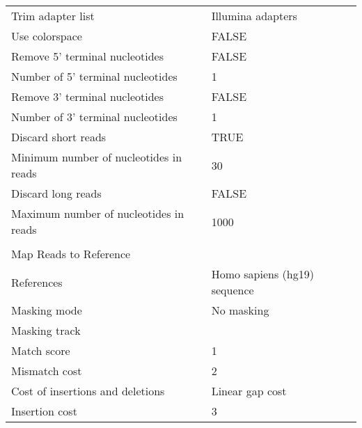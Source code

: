 \begin{longtable}{ll}
Trim adapter list                            & Illumina adapters                              \\
Use colorspace                               & FALSE                                          \\
Remove 5' terminal nucleotides               & FALSE                                          \\
Number of 5' terminal nucleotides            & 1                                              \\
Remove 3' terminal nucleotides               & FALSE                                          \\
Number of 3' terminal nucleotides            & 1                                              \\
Discard short reads                          & TRUE                                           \\
Minimum number of nucleotides in reads       & 30                                             \\
Discard long reads                           & FALSE                                          \\
Maximum number of nucleotides in reads       & 1000                                           \\
                                             &                                                \\
Map Reads to Reference                       &                                                \\
References                                   & Homo sapiens (hg19) sequence                   \\
Masking mode                                 & No masking                                     \\
Masking track                                &                                                \\
Match score                                  & 1                                              \\
Mismatch cost                                & 2                                              \\
Cost of insertions and deletions             & Linear gap cost                                \\
Insertion cost                               & 3                                              \\

\end{longtable}
